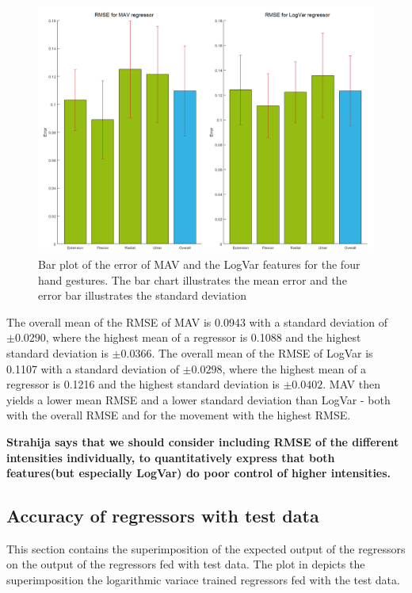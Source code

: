 \begin{figure}[H]
	\includegraphics[width=1\textwidth]{figures/results/gimmeThemRMSEBars}  %
	\caption{Bar plot of the error of MAV and the LogVar features for the four hand gestures. The bar chart illustrates the mean error and the error bar illustrates the standard deviation}
	\label{fig:gimmeThemRMSEBars}  %
\end{figure}

The overall mean of the RMSE of MAV is 0.0943 with a standard deviation of $\pm 0.0290$, where the highest mean of a regressor is 0.1088 and the highest standard deviation is $\pm 0.0366$. The overall mean of the RMSE of LogVar is 0.1107 with a standard deviation of $\pm 0.0298$, where the highest mean of a regressor is 0.1216 and the highest standard deviation is $\pm 0.0402$. MAV then yields a lower mean RMSE and a lower standard deviation than LogVar - both with the overall RMSE and for the movement with the highest RMSE.


\textbf{Strahija says that we should consider including RMSE of the different intensities individually, to quantitatively express that both features(but especially LogVar) do poor control of higher intensities.}
\subsection{Accuracy of regressors with test data}
This section contains the superimposition of the expected output of the regressors on the output of the regressors fed with test data. The plot in  depicts the superimposition the logarithmic variace trained regressors fed with the test data.

